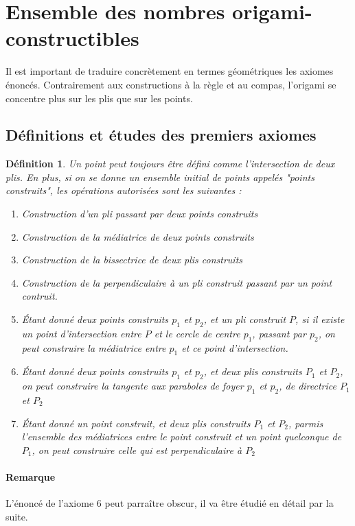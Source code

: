\documentclass[a4paper,12pt,french]{report}
\newtheorem{definition}{Définition}[section]
\begin{document}
\section{Ensemble des nombres origami-constructibles}
			Il est important de traduire concrètement en termes géométriques les axiomes énoncés. Contrairement aux constructions à la règle et au compas, l'origami se concentre plus sur les plis que sur les points.

	
\subsection{Définitions et études des premiers axiomes}

			\begin{definition}
			Un point peut toujours être défini comme l'intersection de deux plis. En plus, si on se donne un ensemble initial de points appelés "points construits", les opérations autorisées sont les suivantes : 
				\begin{enumerate}
					\item Construction d'un pli passant par deux points construits
					\item Construction de la médiatrice de deux points construits
					\item Construction de la bissectrice de deux plis construits
					\item Construction de la perpendiculaire à un pli construit passant par un point contruit.
					\item Étant donné deux points construits $p_{1}$ et $p_{2}$, et un pli construit $P$, si il existe un point d'intersection entre $P$ et le cercle de centre $p_{1}$, passant par $p_{2}$, on peut construire la médiatrice entre $p_{1}$ et ce point d'intersection.
					\item Étant donné deux points construits $p_{1}$ et $p_{2}$, et deux plis construits $P_{1}$ et $P_{2}$, on peut construire la tangente aux paraboles de foyer $p_{1}$ et $p_{2}$, de directrice $P_{1}$ et $P_{2}$
					\item Étant donné un point construit, et deux plis construits $P_{1}$ et $P_{2}$, parmis l'ensemble des médiatrices entre le point construit et un point quelconque de $P_{1}$, on peut construire celle qui est perpendiculaire à $P_{2}$
				\end{enumerate}
			\end{definition}
			
			\paragraph{Remarque}
			L'énoncé de l'axiome 6 peut parraître obscur, il va être étudié en détail par la suite.
\end{document}
